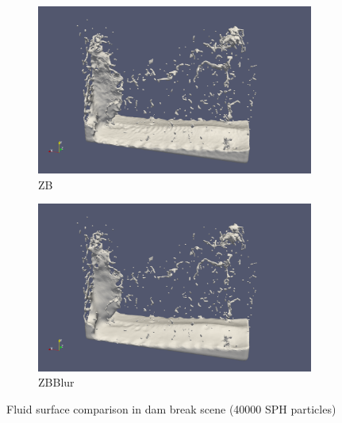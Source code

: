 \begin{figure}
	\begin{center}
        \begin{subfigure}[b]{\textwidth}
               \includegraphics[width=\textwidth]{figures/ReconstructionZhuBridson.png}
				\caption{ZB}
        \end{subfigure}
        \begin{subfigure}[b]{\textwidth}
               \includegraphics[width=\textwidth]{figures/ReconstructionZhuBridsonBlur.png}
				\caption{ZBBlur}
        \end{subfigure}
	\end{center}
	\caption{Fluid surface comparison in dam break scene (40000 SPH particles)}
	\label{fig:DamBreak2}
\end{figure}

